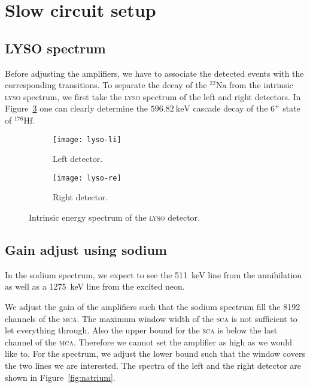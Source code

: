 \documentclass[11pt, english, fleqn, DIV=15, headinclude, BCOR=2cm]{scrreprt}
\begin{document}
\section{Slow circuit setup}

\subsection{LYSO spectrum}

Before adjusting the amplifiers, we have to associate the detected events with
the corresponding transitions. To separate the decay of the ${}^{22}\text{Na}$
from the intrinsic \textsc{lyso} spectrum, we first take the \textsc{lyso}
spectrum of the left and right detectors. In Figure~\ref{fig:lyso} one can
clearly determine the $\SI{596.82}{\kilo\electronvolt}$ cascade decay of the
$6^+$ state of ${}^{176}\text{Hf}$.

\begin{figure}
        \centering
        \begin{subfigure}[c]{.49\linewidth}
                \centering
                \texttt{[image: lyso-li]}
                \caption{%
                        Left detector.
                }
                \label{fig:lyso-li}
        \end{subfigure}
        \hfill
        \begin{subfigure}[c]{.49\linewidth}
                \centering
                \texttt{[image: lyso-re]}
                \caption{%
                        Right detector.
                }
                \label{fig:lyso-re}
        \end{subfigure}
        \caption{%
                Intrinsic energy spectrum of the \textsc{lyso} detector.
        }
        \label{fig:lyso}
\end{figure}
        

\subsection{Gain adjust using sodium}

In the sodium spectrum, we expect to see the \SI{511}{\kilo\electronvolt} line
from the annihilation as well as a \SI{1275}{\kilo\electronvolt} line from the
excited neon.

We adjust the gain of the amplifiers such that the sodium spectrum fill the
8192 channels of the \textsc{mca}. The maximum window width of the \textsc{sca}
is not sufficient to let everything through. Also the upper bound for the
\textsc{sca} is below the last channel of the \textsc{mca}. Therefore we cannot
set the amplifier as high as we would like to. For the spectrum, we adjust the
lower bound such that the window covers the two lines we are interested. The
spectra of the left and the right detector are shown in
Figure~\ref{fig:natrium}.
\end{document}

